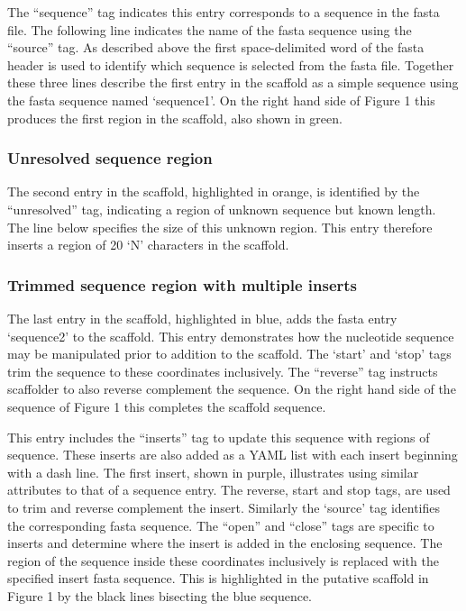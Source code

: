 \documentclass[10pt]{bmc_article}
\newenvironment{bmcformat}{\begin{raggedright}\baselineskip20pt\sloppy\setboolean{publ}{false}}{\end{raggedright}\baselineskip20pt\sloppy}
\begin{document}
\begin{bmcformat}
The ``sequence'' tag indicates this entry corresponds to a sequence in the
fasta file. The following line indicates the name of the fasta sequence using
the ``source'' tag. As described above the first space-delimited word of the
fasta header is used to identify which sequence is selected from the fasta
file. Together these three lines describe the first entry in the scaffold as
a simple sequence using the fasta sequence named `sequence1'. On the right hand
side of Figure 1 this produces the first region in the scaffold, also shown in
green. \pb

\subsubsection*{Unresolved sequence region} %

The second entry in the scaffold, highlighted in orange, is identified by the
``unresolved'' tag, indicating a region of unknown sequence but known length.
The line below specifies the size of this unknown region. This entry therefore
inserts a region of 20 `N' characters in the scaffold. \pb

\subsubsection*{Trimmed sequence region with multiple inserts} %

The last entry in the scaffold, highlighted in blue, adds the fasta entry
`sequence2' to the scaffold. This entry demonstrates how the nucleotide
sequence may be manipulated prior to addition to the scaffold. The `start' and
`stop' tags trim the sequence to these coordinates inclusively. The ``reverse''
tag instructs scaffolder to also reverse complement the sequence. On the right
hand side of the sequence of Figure 1 this completes the scaffold sequence. \pb

This entry includes the ``inserts'' tag to update this sequence with regions of
sequence. These inserts are also added as a YAML list with each insert
beginning with a dash line. The first insert, shown in purple, illustrates
using similar attributes to that of a sequence entry. The reverse, start and
stop tags, are used to trim and reverse complement the insert. Similarly the
`source' tag identifies the corresponding fasta sequence. The ``open'' and
``close'' tags are specific to inserts and determine where the insert is added
in the enclosing sequence. The region of the sequence inside these coordinates
inclusively is replaced with the specified insert fasta sequence. This is
highlighted in the putative scaffold in Figure 1 by the black lines bisecting
the blue sequence. \pb


\end{bmcformat}
\end{document}
